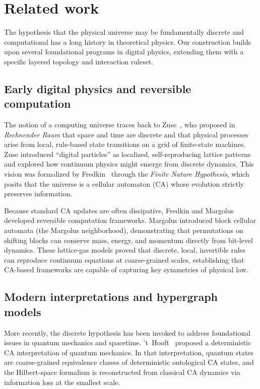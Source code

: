 \documentclass[a4paper]{article}
\begin{document}
\section{Related work}
\label{sec:related-work}

The hypothesis that the physical universe may be fundamentally discrete and computational has a long history in theoretical physics. Our construction builds upon several foundational programs in digital physics, extending them with a specific layered topology and interaction ruleset.

\subsection*{Early digital physics and reversible computation}
The notion of a computing universe traces back to Zuse~\cite{zuse}, who proposed in \emph{Rechnender Raum} that space and time are discrete and that physical processes arise from local, rule-based state transitions on a grid of finite-state machines. Zuse introduced ``digital particles'' as localized, self-reproducing lattice patterns and explored how continuum physics might emerge from discrete dynamics. This vision was formalized by Fredkin~\cite{fredkin} through the \emph{Finite Nature Hypothesis}, which posits that the universe is a cellular automaton (CA) whose evolution strictly preserves information. 

Because standard CA updates are often dissipative, Fredkin and Margolus~\cite{margolus} developed reversible computation frameworks. Margolus introduced block cellular automata (the Margolus neighborhood), demonstrating that permutations on shifting blocks can conserve mass, energy, and momentum directly from bit-level dynamics. These lattice-gas models proved that discrete, local, invertible rules can reproduce continuum equations at coarse-grained scales, establishing that CA-based frameworks are capable of capturing key symmetries of physical law.

\subsection*{Modern interpretations and hypergraph models}
More recently, the discrete hypothesis has been invoked to address foundational issues in quantum mechanics and spacetime. 't~Hooft~\cite{thooft} proposed a deterministic CA interpretation of quantum mechanics.  In that interpretation, quantum states are coarse-grained equivalence classes of deterministic ontological CA states, and the Hilbert-space formalism is reconstructed from classical CA dynamics via information loss at the smallest scale. 
\end{document}

